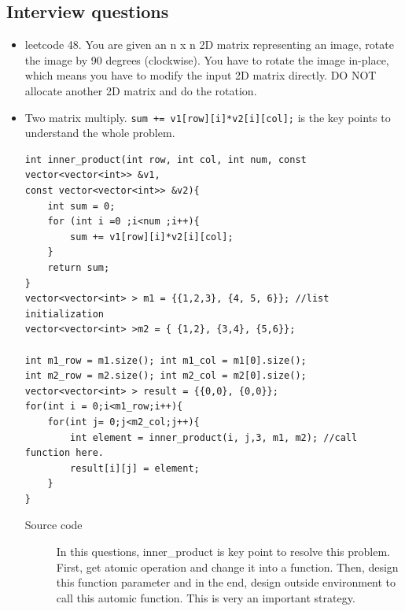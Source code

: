 \documentclass[a4paper,11pt,twoside]{book}
\begin{document}
\subsection{Interview questions}
\begin{itemize}
	
	\item leetcode 48. You are given an n x n 2D matrix representing an image, rotate the image by 90 degrees (clockwise). You have to rotate the image in-place, which means you have to modify the input 2D matrix directly. DO NOT allocate another 2D matrix and do the rotation.
	
	\item Two matrix multiply. \texttt{sum += v1[row][i]*v2[i][col];} is the key points to understand the whole problem. 
\begin{lstlisting}[]
int inner_product(int row, int col, int num, const vector<vector<int>> &v1, 
const vector<vector<int>> &v2){
	int sum = 0;
	for (int i =0 ;i<num ;i++){
		sum += v1[row][i]*v2[i][col];
	}
	return sum;
}
vector<vector<int> > m1 = {{1,2,3}, {4, 5, 6}}; //list initialization
vector<vector<int> >m2 = { {1,2}, {3,4}, {5,6}};

int m1_row = m1.size(); int m1_col = m1[0].size();
int m2_row = m2.size(); int m2_col = m2[0].size();
vector<vector<int> > result = {{0,0}, {0,0}};
for(int i = 0;i<m1_row;i++){
	for(int j= 0;j<m2_col;j++){
		int element = inner_product(i, j,3, m1, m2); //call function here.
		result[i][j] = element;
	}
}		
\end{lstlisting}
	
	\begin{description}	
		\item[Source code] In this questions, inner\_product is key point to resolve this problem. First, get atomic operation and change it into a function. Then, design this function parameter and in the end, design outside environment to call this automic function. This is very an important strategy. 
	\end{description}
	

\end{itemize}
\end{document}
